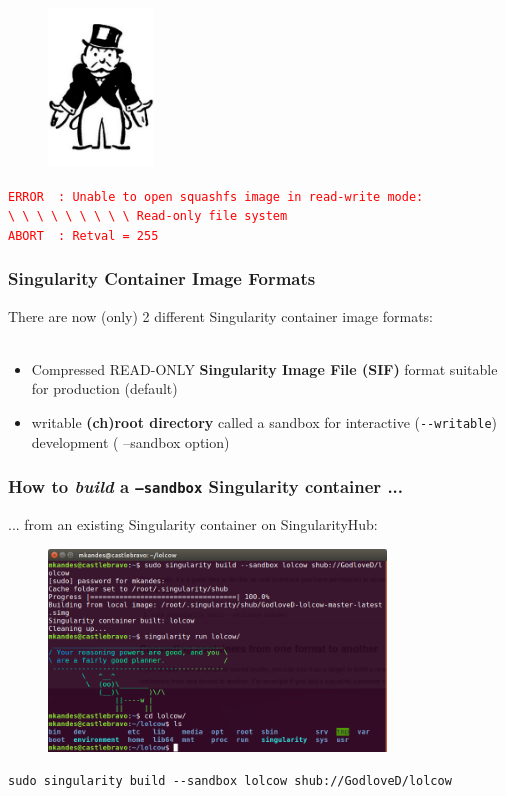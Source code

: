 \documentclass{beamer}
\begin{document}
\begin{frame}
   \frametitle{}
   \begin{figure}[htbp]
      \includegraphics[width=0.25\textwidth]{images/do-not-pass-go.png}
   \end{figure}
   \textcolor{red}{\lstinline{ERROR  : Unable to open squashfs image in read-write mode:}} \\
   \textcolor{red}{\lstinline{\ \ \ \ \ \ \ \ \ Read-only file system}} \\
   \textcolor{red}{\lstinline{ABORT  : Retval = 255}}
\end{frame}

\begin{frame}
   \frametitle{Singularity Container Image Formats}
   There are now (only) 2 different Singularity container image formats: 
   \ \\ \ \\
   \begin{itemize}\setlength\itemsep{1.0em}
      \item Compressed READ-ONLY \textbf{Singularity Image File (SIF)} 
         format suitable for production (default)
      \item writable \textbf{(ch)root directory} called a sandbox for 
         interactive (\lstinline{--writable}) development ( --sandbox option)
   \end{itemize}
\end{frame}

\begin{frame}
   \frametitle{How to \textit{build} a \texttt{--sandbox} Singularity container ...}
   ... from an existing Singularity container on SingularityHub:
   \begin{figure}[htbp]
      \includegraphics[width=0.8\textwidth]{images/singularity-build-sandbox.png}
   \end{figure}
   \lstinline{sudo singularity build --sandbox lolcow shub://GodloveD/lolcow}
\end{frame}
\end{document}
